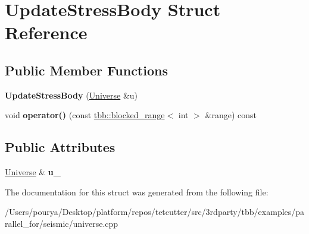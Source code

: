 \hypertarget{structUpdateStressBody}{}\section{Update\+Stress\+Body Struct Reference}
\label{structUpdateStressBody}
\subsection*{Public Member Functions}
\begin{DoxyCompactItemize}
\item 
\hypertarget{structUpdateStressBody_a270fe07509989786a6819d2106d740c1}{}{\bfseries Update\+Stress\+Body} (\hyperlink{classUniverse}{Universe} \&u)\label{structUpdateStressBody_a270fe07509989786a6819d2106d740c1}

\item 
\hypertarget{structUpdateStressBody_ad53299f43f003dbc210578c9801efda2}{}void {\bfseries operator()} (const \hyperlink{classtbb_1_1blocked__range}{tbb\+::blocked\+\_\+range}$<$ int $>$ \&range) const \label{structUpdateStressBody_ad53299f43f003dbc210578c9801efda2}

\end{DoxyCompactItemize}
\subsection*{Public Attributes}
\begin{DoxyCompactItemize}
\item 
\hypertarget{structUpdateStressBody_a16eebea47ad8b58a2f7f74f37a409bf8}{}\hyperlink{classUniverse}{Universe} \& {\bfseries u\+\_\+}\label{structUpdateStressBody_a16eebea47ad8b58a2f7f74f37a409bf8}

\end{DoxyCompactItemize}


The documentation for this struct was generated from the following file\+:\begin{DoxyCompactItemize}
\item 
/\+Users/pourya/\+Desktop/platform/repos/tetcutter/src/3rdparty/tbb/examples/parallel\+\_\+for/seismic/universe.\+cpp\end{DoxyCompactItemize}
